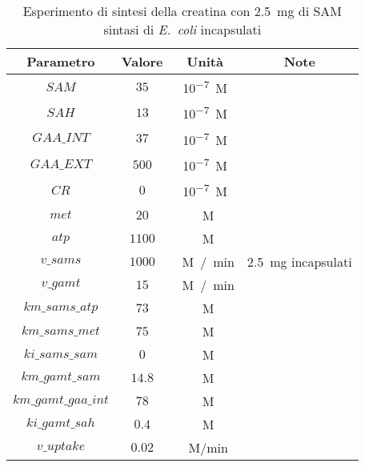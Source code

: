 \begin{table}[H]
	\centering
	\begin{tabular}{| c | c | c | c |}
	\hline
	Parametro & Valore & Unit\`a & Note \\
		\hline
		$SAM$ & $35$ & \si{10^{-7} M} & \\
		\hline
		$SAH$ & $13$ & \si{10^{-7} M} & \\
		\hline
		$GAA\_INT$ & $37$ & \si{10^{-7} M} & \\
		\hline
		$GAA\_EXT$ & $500$ & \si{10^{-7} M} & \\
		\hline
		$CR$ & $0$ & \si{10^{-7} M} & \\
		\hline
		$met$ & $20$ & \si{\mu M} & \\
		\hline
		$atp$ & $1100$ & \si{\mu M} & \\
		\hline
		$v\_sams$ & $1000$ & \si{\mu M / min} & \SI{2.5}{mg} incapsulati \\
		\hline
		$v\_gamt$ & $15$ & \si{\mu M / min} & \\
		\hline
		$km\_sams\_atp$ & $73$ & \si{\mu M} & \\
		\hline
		$km\_sams\_met$ & $75$ & \si{\mu M} & \\
		\hline
		$ki\_sams\_sam$ & $0$ & \si{\mu M} & \\
		\hline
		$km\_gamt\_sam$ & $14.8$ & \si{\mu M} & \\
		\hline
		$km\_gamt\_gaa\_int$ & $78$ & \si{\mu M} & \\
		\hline
		$ki\_gamt\_sah$ & $0.4$ & \si{\mu M} & \\
		\hline
		$v\_uptake$ & $0.02$ & \si{\mu M/min} & \\
		\hline
	\end{tabular}
	\caption{Esperimento di sintesi della creatina con \SI{2.5}{mg} di SAM sintasi di \emph{E.\ coli} incapsulati}
	\label{mod:13}
\end{table}

